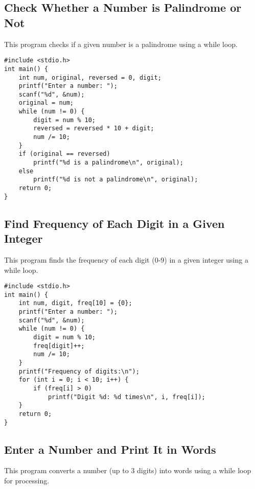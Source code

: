 \documentclass[a4paper,12pt]{article}
\begin{document}
\newpage

\subsection{Check Whether a Number is Palindrome or Not}
This program checks if a given number is a palindrome using a while loop.

\begin{lstlisting}[caption={Check Whether a Number is Palindrome or Not}]
#include <stdio.h>
int main() {
    int num, original, reversed = 0, digit;
    printf("Enter a number: ");
    scanf("%d", &num);
    original = num;
    while (num != 0) {
        digit = num % 10;
        reversed = reversed * 10 + digit;
        num /= 10;
    }
    if (original == reversed)
        printf("%d is a palindrome\n", original);
    else
        printf("%d is not a palindrome\n", original);
    return 0;
}
\end{lstlisting}

\newpage

\subsection{Find Frequency of Each Digit in a Given Integer}
This program finds the frequency of each digit (0-9) in a given integer using a while loop.

\begin{lstlisting}[caption={Find Frequency of Each Digit in a Given Integer}]
#include <stdio.h>
int main() {
    int num, digit, freq[10] = {0};
    printf("Enter a number: ");
    scanf("%d", &num);
    while (num != 0) {
        digit = num % 10;
        freq[digit]++;
        num /= 10;
    }
    printf("Frequency of digits:\n");
    for (int i = 0; i < 10; i++) {
        if (freq[i] > 0)
            printf("Digit %d: %d times\n", i, freq[i]);
    }
    return 0;
}
\end{lstlisting}

\newpage

\subsection{Enter a Number and Print It in Words}
This program converts a number (up to 3 digits) into words using a while loop for processing.
\end{document}
